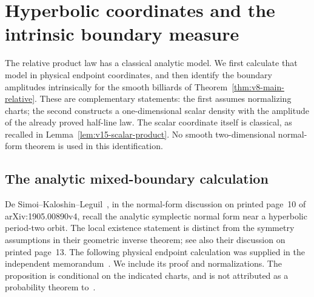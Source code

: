 \section{Hyperbolic coordinates and the intrinsic boundary measure}
\label{sec:v14-hyperbolic}
The relative product law has a classical analytic model. We first
calculate that model in physical endpoint coordinates, and then identify
the boundary amplitudes intrinsically for the smooth billiards of
Theorem~\ref{thm:v8-main-relative}. These are complementary statements:
the first assumes normalizing charts; the second constructs a
one-dimensional scalar density with the amplitude of the already proved
half-line law. The scalar coordinate itself is classical, as recalled
in Lemma~\ref{lem:v15-scalar-product}. No smooth two-dimensional
normal-form theorem is used in this identification.

\subsection{The analytic mixed-boundary calculation}
De Simoi--Kaloshin--Leguil~\cite{DSKL}, in the normal-form discussion on
printed page~10 of arXiv:1905.00890v4, recall the analytic symplectic
normal form near a hyperbolic period-two orbit. The local existence
statement is distinct from the symmetry assumptions in their geometric
inverse theorem; see also their discussion on printed page~13.
The following physical endpoint calculation was supplied in the
independent memorandum~\cite{A2ReviewV13NF}. We include its proof and
normalizations. The proposition is conditional on the indicated charts,
and is not attributed as a probability theorem to~\cite{DSKL}.

